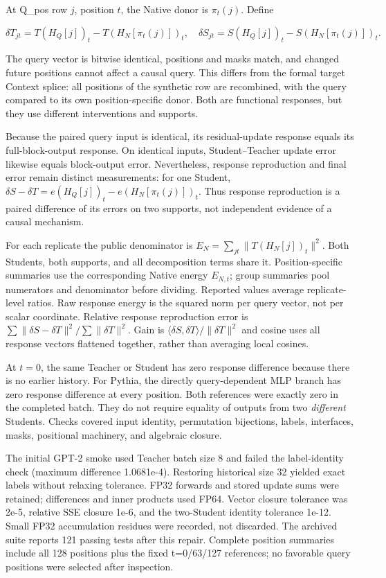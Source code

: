 At Q\_pos row \(j\), position \(t\), the Native donor is \(\pi_t(j)\). Define

\[\delta T_{jt}=T(H_Q[j])_t-T(H_N[\pi_t(j)])_t,
\quad
\delta S_{jt}=S(H_Q[j])_t-S(H_N[\pi_t(j)])_t.\]

The query vector is bitwise identical, positions and masks match, and changed future positions cannot affect a causal query. This differs from the formal target Context splice: all positions of the synthetic row are recombined, with the query compared to its own position-specific donor. Both are functional responses, but they use different interventions and supports.

Because the paired query input is identical, its residual-update response equals its full-block-output response. On identical inputs, Student--Teacher update error likewise equals block-output error. Nevertheless, response reproduction and final error remain distinct measurements: for one Student, \(\delta S-\delta T=e(H_Q[j])_t-e(H_N[\pi_t(j)])_t\). Thus response reproduction is a paired difference of its errors on two supports, not independent evidence of a causal mechanism.

For each replicate the public denominator is \(E_N=\sum_{jt}\|T(H_N[j])_t\|^2\). Both Students, both supports, and all decomposition terms share it. Position-specific summaries use the corresponding Native energy \(E_{N,t}\); group summaries pool numerators and denominator before dividing. Reported values average replicate-level ratios. Raw response energy is the squared norm per query vector, not per scalar coordinate. Relative response reproduction error is \(\sum\|\delta S-\delta T\|^2/\sum\|\delta T\|^2\). Gain is \(\langle\delta S,\delta T\rangle/\|\delta T\|^2\) and cosine uses all response vectors flattened together, rather than averaging local cosines.

At \(t=0\), the same Teacher or Student has zero response difference because there is no earlier history. For Pythia, the directly query-dependent MLP branch has zero response difference at every position. Both references were exactly zero in the completed batch. They do not require equality of outputs from two \emph{different} Students. Checks covered input identity, permutation bijections, labels, interfaces, masks, positional machinery, and algebraic closure.

The initial GPT-2 smoke used Teacher batch size 8 and failed the label-identity check (maximum difference 1.0681e-4). Restoring historical size 32 yielded exact labels without relaxing tolerance. FP32 forwards and stored update sums were retained; differences and inner products used FP64. Vector closure tolerance was 2e-5, relative SSE closure 1e-6, and the two-Student identity tolerance 1e-12. Small FP32 accumulation residues were recorded, not discarded. The archived suite reports 121 passing tests after this repair. Complete position summaries include all 128 positions plus the fixed t=0/63/127 references; no favorable query positions were selected after inspection.

